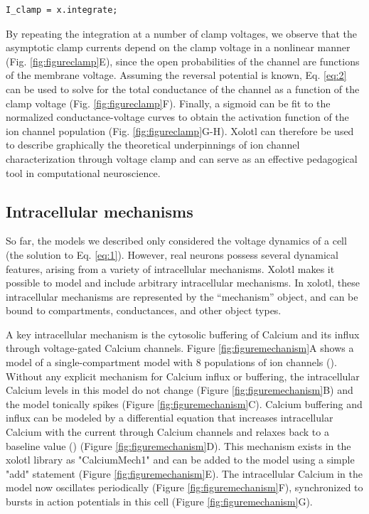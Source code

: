 \documentclass{frontiersSCNS} %
\begin{document}
\begin{lstlisting}[style=Matlab-editor]
I_clamp = x.integrate;
\end{lstlisting}


By repeating the integration at a number of clamp voltages, we observe that the asymptotic clamp currents depend on the clamp voltage in a nonlinear manner (Fig. \ref{fig:figureclamp}E), since the open probabilities of the channel are functions of the membrane voltage. Assuming the reversal potential is known, Eq. \eqref{eq:2} can be used to solve for the total conductance of the channel as a function of the clamp voltage (Fig. \ref{fig:figureclamp}F). Finally, a sigmoid can be fit to the normalized conductance-voltage curves to obtain the activation function of the ion channel population (Fig. \ref{fig:figureclamp}G-H). Xolotl can therefore be used to describe graphically the theoretical underpinnings of ion channel characterization through voltage clamp and can serve as an effective pedagogical tool in computational neuroscience.

%
%
%
%
%
%



\subsection{Intracellular mechanisms}

So far, the models we described only considered the voltage dynamics of a cell (the solution to Eq. \ref{eq:1}). However, real neurons possess several dynamical features, arising from a variety of intracellular mechanisms. Xolotl makes it possible to model and include arbitrary intracellular mechanisms. In xolotl, these intracellular mechanisms are represented by the ``mechanism'' object, and can be bound to compartments, conductances, and other object types.

A key intracellular mechanism is the cytosolic buffering of Calcium and its influx through voltage-gated Calcium channels. Figure \ref{fig:figuremechanism}A shows a model of a single-compartment model with 8 populations of ion channels (\cite{liuModelNeuronActivityDependent1998}). Without any explicit mechanism for Calcium influx or buffering, the intracellular Calcium levels in this model do not change (Figure \ref{fig:figuremechanism}B) and the model tonically spikes (Figure \ref{fig:figuremechanism}C). Calcium buffering and influx can be modeled by a differential equation that increases intracellular Calcium with the current through Calcium channels and relaxes back to a baseline value (\cite{liuModelNeuronActivityDependent1998, prinzAlternativeHandtuningConductancebased2003, dayanTheoreticalNeuroscience2001}) (Figure \ref{fig:figuremechanism}D). This mechanism exists in the xolotl library as "CalciumMech1" and can be added to the model using a simple "add" statement (Figure \ref{fig:figuremechanism}E). The intracellular Calcium in the model now oscillates periodically (Figure \ref{fig:figuremechanism}F), synchronized to bursts in action potentials in this cell (Figure \ref{fig:figuremechanism}G).
\end{document}
